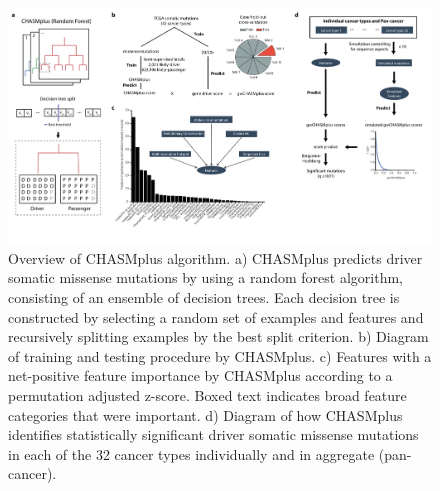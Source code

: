 \begin{figure}
  \centering
  \makeatletter
  \let\@currsize\normalsize
  \includegraphics[width=\linewidth]{figures/chapter6/chasmplus_overview.pdf}
  \caption[Overview of CHASMplus algorithm.]{Overview of CHASMplus algorithm. a) CHASMplus predicts driver somatic missense mutations by using a random forest algorithm, consisting of an ensemble of decision trees. Each decision tree is constructed by selecting a random set of examples and features and recursively splitting examples by the best split criterion. b) Diagram of training and testing procedure by CHASMplus. c) Features with a net-positive feature importance by CHASMplus according to a permutation adjusted z-score. Boxed text indicates broad feature categories that were important. d) Diagram of how CHASMplus identifies statistically significant driver somatic missense mutations in each of the 32 cancer types individually and in aggregate (pan-cancer).}
  \label{fig:chasmplus_overview}
\end{figure}

